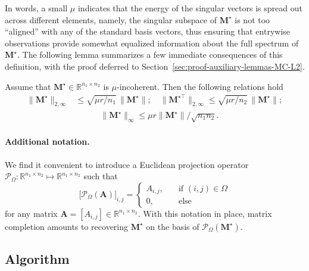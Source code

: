In words, a small $\mu$ indicates that the energy of the singular vectors is spread out across different elements, namely,  the singular subspace of $\bm{M}^{\star}$ is not too ``aligned'' with any of the standard basis vectors,
thus ensuring that entrywise observations provide somewhat equalized information about the full spectrum of $\bm{M}^{\star}$.
The following lemma summarizes a few immediate consequences of this definition, with the proof deferred to Section~\ref{sec:proof-auxiliary-lemmas-MC-L2}.
%
\begin{lemma}\label{claim:mu-incoherence}
Assume that  $\bm{M}^{\star}\in\mathbb{R}^{n_{1}\times n_{2}}$ is $\mu$-incoherent. Then the following relations hold
%
\begin{subequations}
\label{subeq:mu-incoherence}
\begin{align}
	\|\bm{M}^{\star}\|_{2,\infty} & \leq\sqrt{\mu r/n_{1}}\, \big\| \bm{M}^{\star} \big\|; \quad
	\|\bm{M}^{\star\top}\|_{2,\infty}  \leq\sqrt{\mu r/n_{2}}\, \big\| \bm{M}^{\star} \big\|;\label{eq:mc-row-norm-upper}\\
	& \qquad\quad \|\bm{M}^{\star}\|_{\infty}  \leq\mu r  \big\| \bm{M}^{\star} \big\| /\sqrt{n_{1}n_{2}} . \label{eq:mc-entry-upper}
\end{align}
\end{subequations}
%
\end{lemma}



\paragraph{Additional notation.}

We find it convenient to introduce a Euclidean projection operator $\mathcal{P}_{\Omega}:\mathbb{R}^{n_{1}\times n_{2}}\mapsto\mathbb{R}^{n_{1}\times n_{2}}$ such that
%
\begin{equation}\label{defn:Pomega}
\big[\mathcal{P}_{\Omega}(\bm{A}) \big]_{i,j}=\begin{cases}
A_{i,j},\quad & \text{if }(i,j)\in\Omega \\
0, & \text{else}
\end{cases}
\end{equation}
%
for any matrix $\bm{A} =[A_{i,j}]\in\mathbb{R}^{n_{1}\times n_{2}}$.
With this notation in place, matrix completion amounts to recovering $\bm{M}^{\star}$ on the basis of $\mathcal{P}_{\Omega}(\bm{M}^{\star})$.




\subsection{Algorithm}\label{sec:mc-alg}

